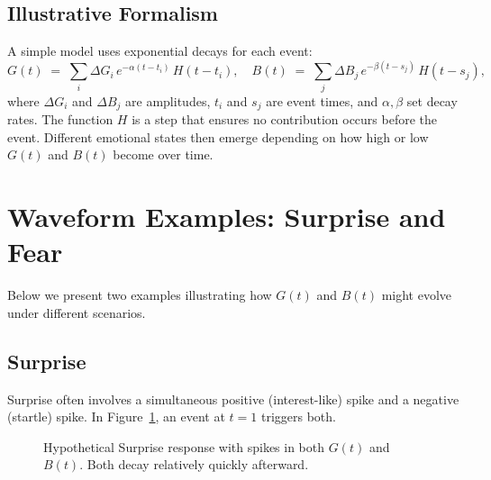 \documentclass[11pt]{article}
\begin{document}
\subsection{Illustrative Formalism}
A simple model uses exponential decays for each event:
\[
G(t) \;=\; \sum_{i} \Delta G_i \, e^{-\alpha (t - t_i)}\, H(t - t_i), 
\quad
B(t) \;=\; \sum_{j} \Delta B_j \, e^{-\beta (t - s_j)}\, H(t - s_j),
\]
where \(\Delta G_i\) and \(\Delta B_j\) are amplitudes, \(t_i\) and \(s_j\) are event times, and \(\alpha,\beta\) set decay rates. The function \(H\) is a step that ensures no contribution occurs before the event. Different emotional states then emerge depending on how high or low \(G(t)\) and \(B(t)\) become over time.

\section{Waveform Examples: Surprise and Fear}
\label{sec:waveform-examples}
Below we present two examples illustrating how \(G(t)\) and \(B(t)\) might evolve under different scenarios.

\subsection{Surprise}
Surprise often involves a simultaneous positive (interest-like) spike and a negative (startle) spike. In Figure~\ref{fig:surprise-waveform}, an event at \(t=1\) triggers both.

\begin{figure}[htbp]
\centering
{}
\caption{Hypothetical Surprise response with spikes in both $G(t)$ and $B(t)$. Both decay relatively quickly afterward.}
\label{fig:surprise-waveform}
\end{figure}
\end{document}

